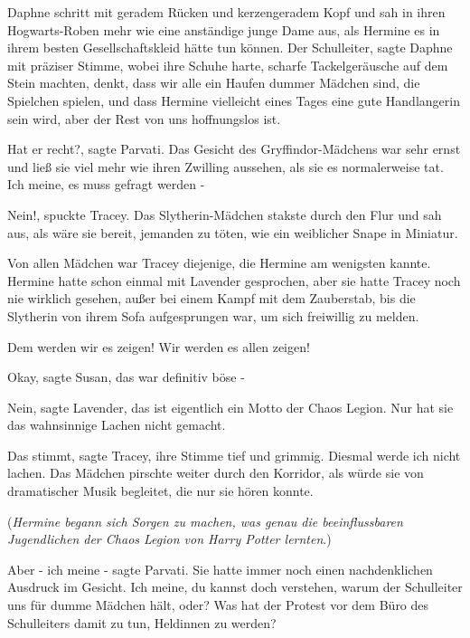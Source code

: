 Daphne schritt mit geradem Rücken und kerzengeradem Kopf und sah in ihren
Hogwarts-Roben mehr wie eine anständige junge Dame aus, als Hermine es in ihrem
besten Gesellschaftskleid hätte tun können. \glqq{}Der Schulleiter\grqq{}, sagte
Daphne mit präziser Stimme, wobei ihre Schuhe harte, scharfe Tackelgeräusche auf
dem Stein machten, \glqq{}denkt, dass wir alle ein Haufen dummer Mädchen sind,
die Spielchen spielen, und dass Hermine vielleicht eines Tages eine gute
Handlangerin sein wird, aber der Rest von uns hoffnungslos ist.\grqq{}

\glqq{}Hat er recht?\grqq{}, sagte Parvati. Das Gesicht des Gryffindor-Mädchens
war sehr ernst und ließ sie viel mehr wie ihren Zwilling aussehen, als sie es
normalerweise tat. \glqq{}Ich meine, es muss gefragt werden -\grqq{}

\glqq{}Nein!\grqq{}, spuckte Tracey. Das Slytherin-Mädchen stakste durch den Flur
und sah aus, als wäre sie bereit, jemanden zu töten, wie ein weiblicher Snape in
Miniatur.

Von allen Mädchen war Tracey diejenige, die Hermine am wenigsten kannte. Hermine
hatte schon einmal mit Lavender gesprochen, aber sie hatte Tracey noch nie
wirklich gesehen, außer bei einem Kampf mit dem Zauberstab, bis die Slytherin
von ihrem Sofa aufgesprungen war, um sich freiwillig zu melden.

\glqq{}Dem werden wir es zeigen! Wir werden es allen zeigen!\grqq{}

\glqq{}Okay\grqq{}, sagte Susan, \glqq{}das war definitiv böse -\grqq{}

\glqq{}Nein\grqq{}, sagte Lavender, \glqq{}das ist eigentlich ein Motto der Chaos
Legion. Nur hat sie das wahnsinnige Lachen nicht gemacht.\grqq{}

\glqq{}Das stimmt\grqq{}, sagte Tracey, ihre Stimme tief und grimmig. \glqq{}
Diesmal werde ich nicht lachen.\grqq{} Das Mädchen pirschte weiter durch den
Korridor, als würde sie von dramatischer Musik begleitet, die nur sie hören
konnte.

(\emph{Hermine begann sich Sorgen zu machen, was genau die beeinflussbaren
Jugendlichen der Chaos Legion von Harry Potter lernten}.)

\glqq{}Aber - ich meine -\grqq{} sagte Parvati. Sie hatte immer noch einen
nachdenklichen Ausdruck im Gesicht. \glqq{}Ich meine, du kannst doch verstehen,
warum der Schulleiter uns für dumme Mädchen hält, oder? Was hat der Protest vor
dem Büro des Schulleiters damit zu tun, Heldinnen zu werden?\grqq{}

